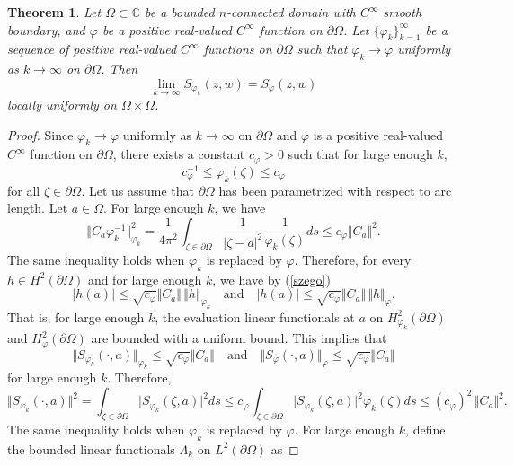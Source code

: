 \documentclass[11pt, reqno]{amsart}
\newtheorem{thm}{Theorem}[section]
\numberwithin{equation}{section}
\begin{document}
\begin{thm}\label{ram 1}
Let $\Omega\subset\mathbb{C}$ be a bounded $n$-connected domain with $C^{\infty}$ smooth boundary, and $\varphi$ be a positive real-valued $C^{\infty}$ function on $\partial\Omega$. Let $\{\varphi_k\}_{k=1}^{\infty}$ be a sequence of positive real-valued $C^{\infty}$ functions on $\partial\Omega$ such that $\varphi_k\rightarrow\varphi$ uniformly as $k\rightarrow\infty$ on $\partial\Omega$. Then
\[
\lim\limits_{k\rightarrow\infty} S_{\varphi_k}(z,w) = S_{\varphi}(z,w)
\]
locally uniformly on $\Omega\times\Omega$.
\end{thm}

\begin{proof}
Since $\varphi_k\rightarrow\varphi$ uniformly as $k\rightarrow\infty$ on $\partial\Omega$ and $\varphi$ is a positive real-valued $C^{\infty}$ function on $\partial\Omega$, there exists a constant $c_{\varphi}>0$ such that for large enough $k$, 
\[
{c^{-1}_{\varphi}} \leq \varphi_{k}(\zeta)\leq c_{\varphi} 
\]
for all $\zeta\in\partial\Omega$. Let us assume that $\partial\Omega$ has been parametrized with respect to arc length. Let $a\in\Omega$. For large enough $k$, we have
\[
\Vert C_a\varphi^{-1}_k\Vert_{\varphi_k}^2=\frac{1}{4\pi^2}\int_{\zeta\in\partial\Omega} \frac{1}{\vert \zeta-a\vert^2}\frac{1}{\varphi_k(\zeta)} ds \leq
c_{\varphi} \Vert C_a\Vert^2.
\]
The same inequality holds when $\varphi_k$ is replaced by $\varphi$. Therefore, for every $h\in H^2(\partial\Omega)$ and for large enough $k$, we have by (\ref{szego})
\[
\vert h(a)\vert \leq \sqrt{c_{\varphi}} \Vert C_a\Vert\, \Vert h\Vert_{\varphi_k}\quad\text{and}\quad\vert h(a)\vert \leq \sqrt{c_{\varphi}} \Vert C_a\Vert\, \Vert h\Vert_{\varphi}.
\]
That is, for large enough $k$, the evaluation linear functionals at $a$ on $H^2_{\varphi_k}(\partial\Omega)$ and $H^2_{\varphi}(\partial\Omega)$ are bounded with a uniform bound. This implies that
\[
\Vert S_{\varphi_k}(\cdot,a)\Vert_{\varphi_k} \leq \sqrt{c_{\varphi}} \Vert C_a\Vert \quad \text{and} \quad \Vert S_{\varphi}(\cdot,a)\Vert_{\varphi} \leq \sqrt{c_{\varphi}} \Vert C_a\Vert
\]
for large enough $k$. Therefore,
\begin{equation}\label{szego1}
\Vert S_{\varphi_k}(\cdot,a)\Vert^2=\int_{\zeta\in\partial\Omega}\vert S_{\varphi_k}(\zeta,a)\vert^2 ds \leq {c_{\varphi}} \int_{\zeta\in\partial\Omega}\vert S_{\varphi_k}(\zeta,a)\vert^2 \varphi_k(\zeta) ds \leq (c_{\varphi})^2\,\Vert C_a\Vert^2.
\end{equation}
The same inequality holds when $\varphi_k$ is replaced by $\varphi$. For large enough $k$, define the bounded linear functionals $\Lambda_k$ on $L^2(\partial\Omega)$ as

\end{proof}
\end{document}
